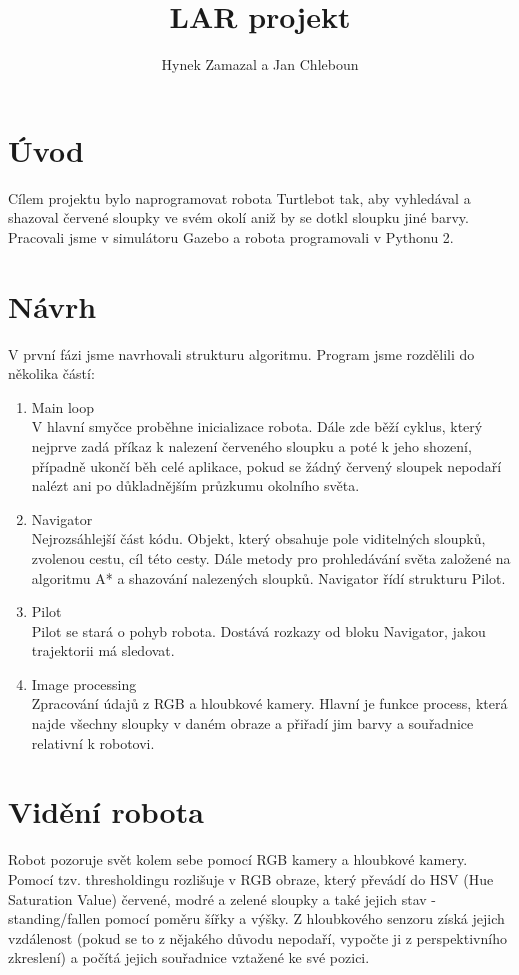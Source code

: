 \documentclass{article}
\title{LAR projekt}
\author{Hynek Zamazal a Jan Chleboun}
\date{}
\begin{document}
\maketitle
\section{Úvod}
Cílem projektu bylo naprogramovat robota Turtlebot tak, aby vyhledával a shazoval červené sloupky ve svém okolí aniž by se dotkl sloupku jiné barvy. Pracovali jsme v simulátoru Gazebo a robota programovali v Pythonu 2.
\section{Návrh}
V první fázi jsme navrhovali strukturu algoritmu. Program jsme rozdělili do několika částí:
\begin{enumerate}
    \item Main loop\\
V hlavní smyčce proběhne inicializace robota. Dále zde běží cyklus, který nejprve zadá příkaz k nalezení červeného sloupku a poté k jeho shození, případně ukončí běh celé aplikace, pokud se žádný červený sloupek nepodaří nalézt ani po důkladnějším průzkumu okolního světa.
    \item Navigator\\
    Nejrozsáhlejší část kódu. Objekt, který obsahuje pole viditelných sloupků, zvolenou cestu, cíl této cesty. Dále metody pro prohledávání světa založené na algoritmu A* a shazování nalezených sloupků. Navigator řídí strukturu Pilot. 
    \item Pilot\\
    Pilot se stará o pohyb robota. Dostává rozkazy od bloku Navigator, jakou trajektorii má sledovat.
    \item Image processing\\
    Zpracování údajů z RGB a hloubkové kamery. Hlavní je funkce process, která najde všechny sloupky v daném obraze a přiřadí jim barvy a souřadnice relativní k robotovi.
\end{enumerate}
\section{Vidění robota}
Robot pozoruje svět kolem sebe pomocí RGB kamery a hloubkové kamery. Pomocí tzv. thresholdingu rozlišuje v RGB obraze, který převádí do HSV (Hue Saturation Value) červené, modré a zelené sloupky a také jejich stav - standing/fallen pomocí poměru šířky a výšky. Z hloubkového senzoru získá jejich vzdálenost (pokud se to z nějakého důvodu nepodaří, vypočte ji z perspektivního zkreslení) a počítá jejich souřadnice vztažené ke své pozici.
\end{document}
